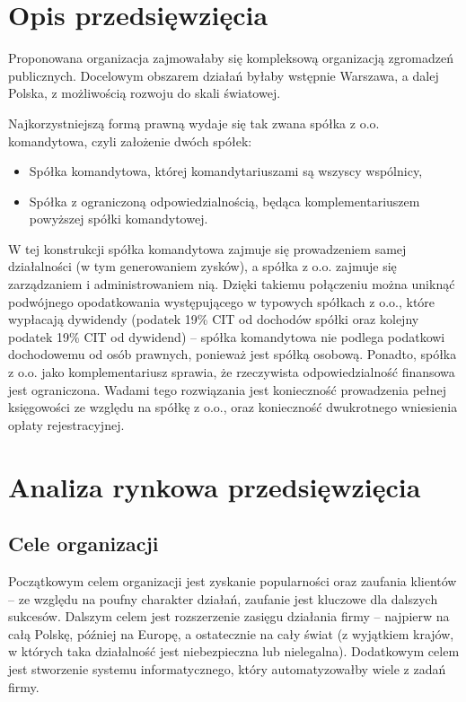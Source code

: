 \documentclass{article}
\begin{document}
\section{Opis przedsięwzięcia}
Proponowana organizacja zajmowałaby się kompleksową organizacją zgromadzeń publicznych. Docelowym obszarem działań byłaby wstępnie Warszawa, a dalej Polska, z możliwością rozwoju do skali światowej.   

Najkorzystniejszą formą prawną wydaje się tak zwana spółka z o.o. komandytowa, czyli założenie dwóch spółek:
\begin{itemize}
\item Spółka komandytowa, której komandytariuszami są wszyscy wspólnicy,
\item Spółka z ograniczoną odpowiedzialnością, będąca komplementariuszem powyższej spółki komandytowej.
\end{itemize}
W tej konstrukcji spółka komandytowa zajmuje się prowadzeniem samej działalności (w tym generowaniem zysków), a spółka z o.o. zajmuje się zarządzaniem i administrowaniem nią. Dzięki takiemu połączeniu można uniknąć podwójnego opodatkowania występującego w typowych spółkach z o.o., które wypłacają dywidendy (podatek 19\% CIT od dochodów spółki oraz kolejny podatek 19\% CIT od dywidend) -- spółka komandytowa nie podlega podatkowi dochodowemu od osób prawnych, ponieważ jest spółką osobową. Ponadto, spółka z o.o. jako komplementariusz sprawia, że rzeczywista odpowiedzialność finansowa jest ograniczona. Wadami tego rozwiązania jest konieczność prowadzenia pełnej księgowości ze względu na spółkę z o.o., oraz konieczność dwukrotnego wniesienia opłaty rejestracyjnej.


\section{Analiza rynkowa przedsięwzięcia}
\subsection{Cele organizacji}
Początkowym celem organizacji jest zyskanie popularności oraz zaufania klientów -- ze względu na poufny charakter działań, zaufanie jest kluczowe dla dalszych sukcesów. Dalszym celem jest rozszerzenie zasięgu działania firmy -- najpierw na całą Polskę, później na Europę, a ostatecznie na cały świat (z wyjątkiem krajów, w których taka działalność jest niebezpieczna lub nielegalna). Dodatkowym celem jest stworzenie systemu informatycznego, który automatyzowałby wiele z zadań firmy.
\end{document}
